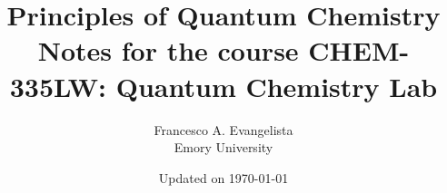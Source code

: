 \documentclass[12pt]{../Main/lecturenotes}
\title{\Huge \headingfont 
    \fontsize{42pt}{48pt} \textbf{Principles of Quantum Chemistry} \\
    \vspace{1in}
    {Notes for the course CHEM-335LW: Quantum Chemistry Lab}
    \vspace{1in}
}
\author{\headingfont \Large  Francesco A. Evangelista \vspace{.125in} \\ \headingfont Emory University }
\date{\headingfont Updated on \today}
\begin{document}
\maketitle

\pagebreak

\tableofcontents



\graphicspath{{../01-Basics/}}


\graphicspath{{../02-BornOppenheimer/}}


\graphicspath{{../03-Hartree-Fock/}}


\graphicspath{{../04-StationaryPoints/}}


\graphicspath{{../05-BasisSets/}}


\graphicspath{{../06-DFT/}}


\graphicspath{{../07-TransitionStates/}}


\graphicspath{{../08-OpenShells/}}


\graphicspath{{../09-CorrelatedMethods/}}


\graphicspath{{../10-Thermochemistry/}}


\graphicspath{{../11-ModelingInteractions/}}

%
%
\end{document}
